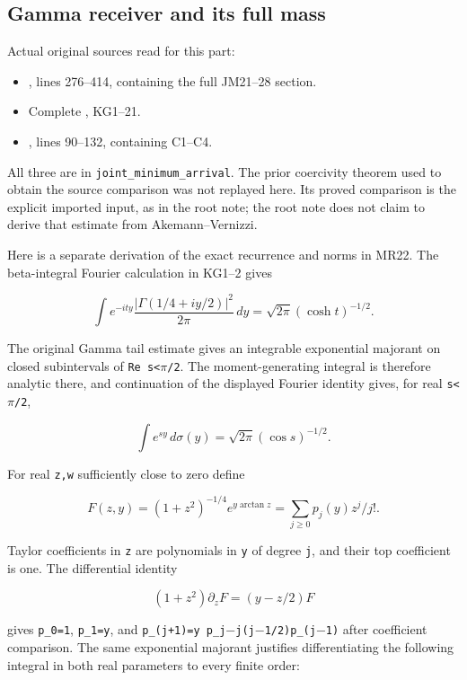 \subsection{Gamma receiver and its full mass}\label{mrreview:gamma-receiver-and-its-full-mass}

Actual original sources read for this part:

\begin{itemize}
\mrreviewtightlist
\item
  , lines 276--414, containing the full JM21--28 section.
\item
  Complete , KG1--21.
\item
  , lines 90--132, containing C1--C4.
\end{itemize}

All three are in \texttt{joint\_minimum\_arrival}. The prior coercivity theorem used to obtain the source comparison was not replayed here. Its proved comparison is the explicit imported input, as in the root note; the root note does not claim to derive that estimate from Akemann--Vernizzi.

Here is a separate derivation of the exact recurrence and norms in MR22. The beta-integral Fourier calculation in KG1--2 gives

\[
\int e^{-ity}\frac{|\Gamma(1/4+iy/2)|^2}{2\pi}\,dy
=\sqrt{2\pi}(\cosh t)^{-1/2}.
\]

The original Gamma tail estimate gives an integrable exponential majorant on closed subintervals of \texttt{\textbar{}Re\ s\textbar{}\textless{}\ensuremath{\pi}/2}. The moment-generating integral is therefore analytic there, and continuation of the displayed Fourier identity gives, for real \texttt{\textbar{}s\textbar{}\textless{}\ensuremath{\pi}/2},

\[
\int e^{sy}\,d\sigma(y)=\sqrt{2\pi}(\cos s)^{-1/2}.
\]

For real \texttt{z,w} sufficiently close to zero define

\[
F(z,y)=(1+z^2)^{-1/4}e^{y\arctan z}
=\sum_{j\ge0}p_j(y)z^j/j!.
\]

Taylor coefficients in \texttt{z} are polynomials in \texttt{y} of degree \texttt{j}, and their top coefficient is one. The differential identity

\[
(1+z^2)\partial_z F=(y-z/2)F
\]

gives \texttt{p\_0=1}, \texttt{p\_1=y}, and \texttt{p\_(j+1)=y\ p\_j\ensuremath{-}j(j\ensuremath{-}1/2)p\_(j\ensuremath{-}1)} after coefficient comparison. The same exponential majorant justifies differentiating the following integral in both real parameters to every finite order:

